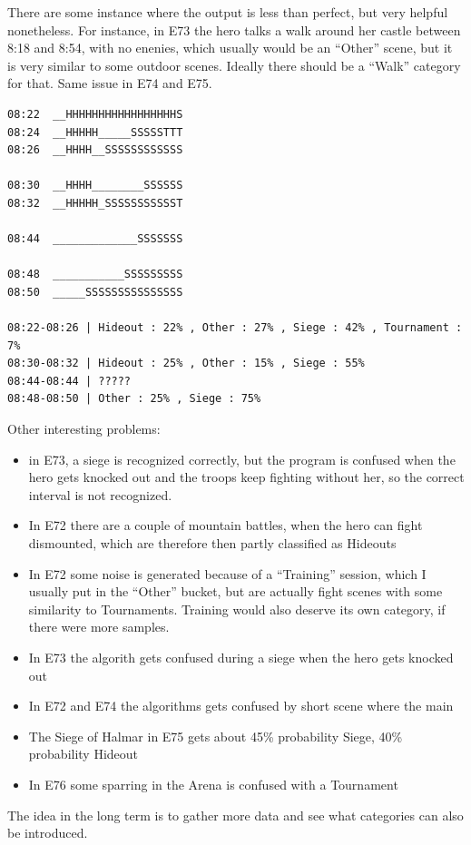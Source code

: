 \documentclass[
]{article}
\providecommand{\tightlist}{%
  \setlength{\itemsep}{0pt}\setlength{\parskip}{0pt}}
\begin{document}
There are some instance where the output is less than perfect, but very
helpful nonetheless. For instance, in E73 the hero talks a walk around
her castle between 8:18 and 8:54, with no enenies, which usually would
be an ``Other'' scene, but it is very similar to some outdoor scenes.
Ideally there should be a ``Walk'' category for that. Same issue in E74
and E75.

\begin{verbatim}
08:22  __HHHHHHHHHHHHHHHHHS
08:24  __HHHHH_____SSSSSTTT
08:26  __HHHH__SSSSSSSSSSSS

08:30  __HHHH________SSSSSS
08:32  __HHHHH_SSSSSSSSSSST

08:44  _____________SSSSSSS

08:48  ___________SSSSSSSSS
08:50  _____SSSSSSSSSSSSSSS

08:22-08:26 | Hideout : 22% , Other : 27% , Siege : 42% , Tournament : 7%
08:30-08:32 | Hideout : 25% , Other : 15% , Siege : 55%
08:44-08:44 | ?????
08:48-08:50 | Other : 25% , Siege : 75%
\end{verbatim}

Other interesting problems:

\begin{itemize}
\tightlist
\item
  in E73, a siege is recognized correctly, but the program is confused
  when the hero gets knocked out and the troops keep fighting without
  her, so the correct interval is not recognized.
\item
  In E72 there are a couple of mountain battles, when the hero can fight
  dismounted, which are therefore then partly classified as Hideouts
\item
  In E72 some noise is generated because of a ``Training'' session,
  which I usually put in the ``Other'' bucket, but are actually fight
  scenes with some similarity to Tournaments. Training would also
  deserve its own category, if there were more samples.
\item
  In E73 the algorith gets confused during a siege when the hero gets
  knocked out
\item
  In E72 and E74 the algorithms gets confused by short scene where the
  main\\
\item
  The Siege of Halmar in E75 gets about 45\% probability Siege, 40\%
  probability Hideout
\item
  In E76 some sparring in the Arena is confused with a Tournament
\end{itemize}

The idea in the long term is to gather more data and see what categories
can also be introduced.
\end{document}
